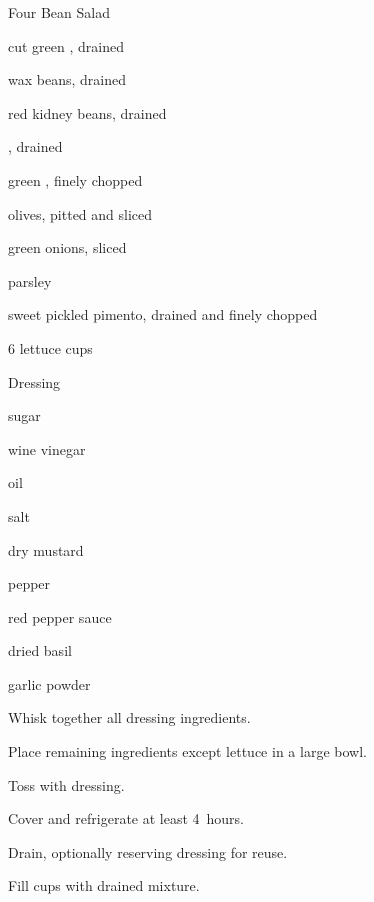 \begin{recipe}{Four Bean Salad}{}{}

\begin{ingredients}
\item {} cut green , drained
\item {} wax beans, drained
\item {} red kidney beans, drained
\item {} , drained
\item \C{\half} green , finely chopped
\item \C{\half} olives, pitted and sliced
\item \C{\quarter} green onions, sliced
\item \C{\quarter} parsley
\item \C{\quarter} sweet pickled pimento, drained and finely chopped
\item 6 lettuce cups
\end{ingredients}
Dressing
\begin{ingredients}
\item \C{\half} sugar
\item \C{\half} wine vinegar
\item \C{\half} oil
\item \tp{1\half} salt
\item \tp{\half} dry mustard
\item \tp{\half} pepper
\item \tp{\half} red pepper sauce
\item \tp{\quarter} dried basil
\item \tp{\quarter} garlic powder
\end{ingredients}

\begin{directions}
\item Whisk together all dressing ingredients.
\item Place remaining ingredients except lettuce in a large bowl.
\item Toss with dressing.
\item Cover and refrigerate at least 4~hours.
\item Drain, optionally reserving dressing for reuse.
\item Fill cups with drained mixture.
\end{directions}

\end{recipe}
